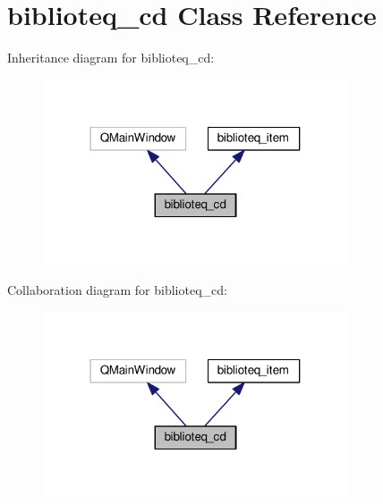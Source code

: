 \hypertarget{classbiblioteq__cd}{}\section{biblioteq\+\_\+cd Class Reference}
\label{classbiblioteq__cd}


Inheritance diagram for biblioteq\+\_\+cd\+:
\nopagebreak
\begin{figure}[H]
\begin{center}
\leavevmode
\includegraphics[width=256pt]{classbiblioteq__cd__inherit__graph}
\end{center}
\end{figure}


Collaboration diagram for biblioteq\+\_\+cd\+:
\nopagebreak
\begin{figure}[H]
\begin{center}
\leavevmode
\includegraphics[width=256pt]{classbiblioteq__cd__coll__graph}
\end{center}
\end{figure}
